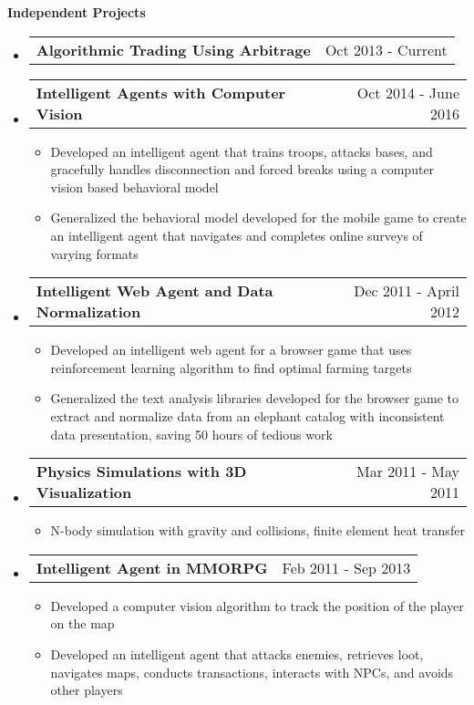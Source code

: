 \documentclass[letterpaper,12pt]{article}
\makeatletter
\newcommand{\resitem}[1]{\item #1 \vspace{-2pt}}
\newcommand{\resheading}[1]{{\large \colorbox{mygrey}{\begin{minipage}{\textwidth}{\textbf{\sc #1 \vphantom{p\^{E}}}}\end{minipage}}}}
\newcommand{\miniheading}[2]{
	\begin{tabular*}{6.5in}{l@{\extracolsep{\fill}}r}
			\textbf{#1} & #2 \\
	\end{tabular*}\vspace{-6pt}
}
\makeatother
\begin{document}
	
	\resheading{Independent Projects}
    \begin{itemize}
        \item \miniheading{Algorithmic Trading Using Arbitrage}{Oct 2013 - Current}
        \item \miniheading{Intelligent Agents with Computer Vision}{Oct 2014 - June 2016}
            \begin{itemize}
                \resitem{Developed an intelligent agent that trains troops, attacks bases, and gracefully handles disconnection and forced breaks using a computer vision based behavioral model}
                \resitem{Generalized the behavioral model developed for the mobile game to create an intelligent agent that navigates and completes online surveys of varying formats}
            \end{itemize}
        \item \miniheading{Intelligent Web Agent and Data Normalization}{Dec 2011 - April 2012}
            \begin{itemize}
                \resitem{Developed an intelligent web agent for a browser game that uses reinforcement learning algorithm to find optimal farming targets}
                \resitem{Generalized the text analysis libraries developed for the browser game to extract and normalize data from an elephant catalog with inconsistent data presentation, saving 50 hours of tedious work}
            \end{itemize}
        \item \miniheading{Physics Simulations with 3D Visualization}{Mar 2011 - May 2011}
            \begin{itemize}
                \resitem{N-body simulation with gravity and collisions, finite element heat transfer}
            \end{itemize}
        \item \miniheading{Intelligent Agent in MMORPG}{Feb 2011 - Sep 2013}
            \begin{itemize}
                \resitem{Developed a computer vision algorithm to track the position of the player on the map}
                \resitem{Developed an intelligent agent that attacks enemies, retrieves loot, navigates maps, conducts transactions, interacts with NPCs, and avoids other players}
            \end{itemize}
    \end{itemize}
\end{document}
